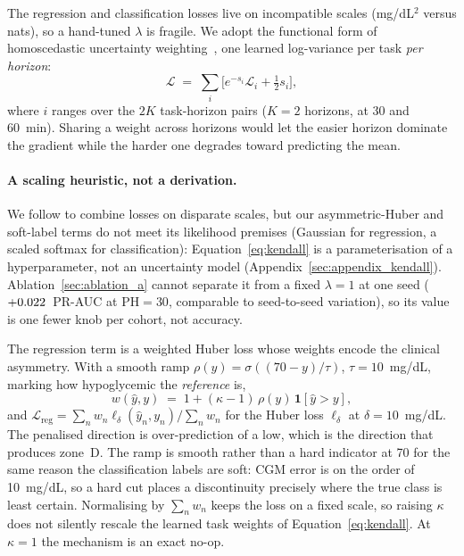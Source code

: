 \documentclass[pmlr,twocolumn,10pt]{jmlr}
\newcommand{\PH}{\mathrm{PH}}
\newcommand{\ind}{\mathbf{1}}
\begin{document}
The regression and classification losses live on incompatible scales
(mg/dL$^2$ versus nats), so a hand-tuned $\lambda$ is fragile. We adopt the
functional form of homoscedastic uncertainty
weighting~\citep{kendall2018multitask}, one learned log-variance per task
\emph{per horizon}:
\begin{equation}
  \mathcal{L} \;=\; \sum_{i} \Big[ e^{-s_i} \mathcal{L}_i + \tfrac{1}{2} s_i \Big],
  \label{eq:kendall}
\end{equation}
where $i$ ranges over the $2K$ task-horizon pairs ($K = 2$ horizons, at 30 and
60~min). Sharing a weight across
horizons would let the easier horizon dominate the gradient while the harder one
degrades toward predicting the mean.

\paragraph{A scaling heuristic, not a derivation.} We follow
\citet{kendall2018multitask} to combine losses on disparate scales, but our
asymmetric-Huber and soft-label terms do not meet its likelihood premises
(Gaussian for regression, a scaled softmax for classification):
Equation~\ref{eq:kendall} is a parameterisation of a hyperparameter, not an
uncertainty model (Appendix~\ref{sec:appendix_kendall}).
Ablation~\ref{sec:ablation_a} cannot separate it from a fixed $\lambda = 1$ at
one seed ($+0.022$~PR-AUC at $\PH = 30$, comparable to
seed-to-seed variation), so its value is
one fewer knob per cohort, not accuracy.


The regression term is a weighted Huber loss whose weights encode the clinical
asymmetry. With a smooth ramp
$\rho(y) = \sigma\!\left((70 - y)/\tau\right)$, $\tau = 10$~mg/dL, marking how
hypoglycemic the \emph{reference} is,
\begin{equation}
  w(\hat{y}, y) \;=\; 1 + (\kappa - 1)\,\rho(y)\,\ind[\hat{y} > y],
  \label{eq:asym}
\end{equation}
and $\mathcal{L}_{\text{reg}} = \sum_n w_n \ell_\delta(\hat{y}_n, y_n) /
\sum_n w_n$ for the Huber loss $\ell_\delta$ at $\delta = 10$~mg/dL. The
penalised direction is over-prediction of a low, which is the
direction that produces zone~D. The ramp is smooth rather than a hard indicator
at 70 for the same reason the classification labels are soft: CGM error is on
the order of 10~mg/dL, so a hard cut places a discontinuity precisely where the
true class is least certain. Normalising by $\sum_n w_n$ keeps the loss on a
fixed scale, so raising $\kappa$ does not silently rescale the learned task
weights of Equation~\ref{eq:kendall}. At $\kappa = 1$ the mechanism is an exact
no-op.
\end{document}
